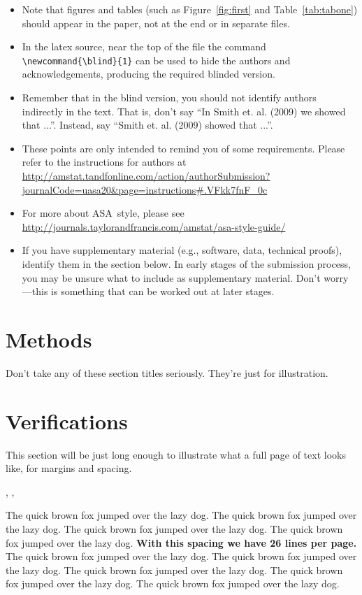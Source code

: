 \documentclass[12pt]{article}
\newcommand{\blind}{0}
\begin{document}
\begin{itemize}
\item Note that figures and tables (such as Figure~\ref{fig:first} and
Table~\ref{tab:tabone}) should appear in the paper, not at the end or
in separate files.
\item In the latex source, near the top of the file the command
\verb+\newcommand{\blind}{1}+ can be used to hide the authors and
acknowledgements, producing the required blinded version.
\item Remember that in the blind version, you should not identify authors
indirectly in the text.  That is, don't say ``In Smith et. al.  (2009) we
showed that ...''.  Instead, say ``Smith et. al. (2009) showed that ...''.
\item These points are only intended to remind you of some requirements.
Please refer to the instructions for authors
at \url{http://amstat.tandfonline.com/action/authorSubmission?journalCode=uasa20&page=instructions#.VFkk7fnF_0c}
\item For more about ASA\ style, please see \url{http://journals.taylorandfrancis.com/amstat/asa-style-guide/}
\item If you have supplementary material (e.g., software, data, technical
proofs), identify them in the section below.  In early stages of the
submission process, you may be unsure what to include as supplementary
material.  Don't worry---this is something that can be worked out at later stages.
\end{itemize}

\section{Methods}
\label{sec:meth}
Don't take any of these section titles seriously.  They're just for
illustration.



\section{Verifications}
\label{sec:verify}

\autocite{abbottCISincidence}

This section will be just long enough to illustrate what a full page of
text looks like, for margins and spacing.

\addtolength{\textheight}{.5in}%


\cite{Campbell02}, \cite{Schubert13}, \cite{Chi81}


The quick brown fox jumped over the lazy dog.
The quick brown fox jumped over the lazy dog.
The quick brown fox jumped over the lazy dog.
The quick brown fox jumped over the lazy dog.
{\bf With this spacing we have 26 lines per page.}
The quick brown fox jumped over the lazy dog.
The quick brown fox jumped over the lazy dog.
The quick brown fox jumped over the lazy dog.
The quick brown fox jumped over the lazy dog.
The quick brown fox jumped over the lazy dog.
\end{document}
